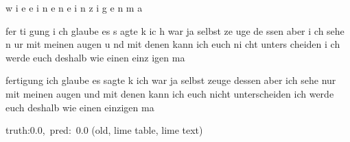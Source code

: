 \documentclass[a4paper,10pt,twoside]{article}
\begin{document}
{\color[rgb]{0.0,0,0} w}{\color[rgb]{0.0,0,0} i}{\color[rgb]{0.0,0,0} e} {\color[rgb]{0.204,0,0} e}{\color[rgb]{1,0,0} i}{\color[rgb]{1,0,0} n}{\color[rgb]{0.0,0,0} e}{\color[rgb]{0.0,0,0} n} {\color[rgb]{1,0,0} e}{\color[rgb]{0.12,0,0} i}{\color[rgb]{0.137,0,0} n}{\color[rgb]{1,0,0} z}{\color[rgb]{1,0,0} i}{\color[rgb]{1,0,0} g}{\color[rgb]{1,0,0} e}{\color[rgb]{1,0,0} n} {\color[rgb]{0.0,0,0} m}{\color[rgb]{0.0,0,0} a}

fer{\color[rgb]{0,0,1} t}i{\color[rgb]{1,0,0} g}ung   i{\color[rgb]{0,0,1} c}h {\color[rgb]{1,0,0} g}laube es   s{\color[rgb]{1,0,0} a}gte k    ic{\color[rgb]{0,0,1} h} war {\color[rgb]{0,0,1} j}a selbst ze{\color[rgb]{1,0,0} u}ge de{\color[rgb]{1,0,0} s}sen  {\color[rgb]{1,0,0} a}ber i{\color[rgb]{0,0,1} c}h sehe n{\color[rgb]{1,0,0} u}r mit meinen augen  {\color[rgb]{0,0,1} u}{\color[rgb]{1,0,0} n}d {\color[rgb]{0,0,1} m}it denen kann ich euch ni{\color[rgb]{1,0,0} c}ht unters{\color[rgb]{1,0,0} c}heiden  i{\color[rgb]{0,0,1} c}h werde euch deshalb wie einen einz{\color[rgb]{1,0,0} i}gen ma

 {\color[rgb]{0,0,1} fertigung} ich glaube es {\color[rgb]{0,0,1} sagte} k ich war ja {\color[rgb]{0,0,1} selbst} zeuge dessen aber ich sehe nur mit meinen augen und mit denen {\color[rgb]{0,0,1} kann} ich {\color[rgb]{0,0,1} euch} nicht unterscheiden ich werde euch deshalb wie einen einzigen ma

 {\footnotesize {\color[rgb]{0.6, 0.6, 0.6}truth:0.0,~pred:~0.0}} (old, lime table, lime text)\hrulefill
\end{document}
